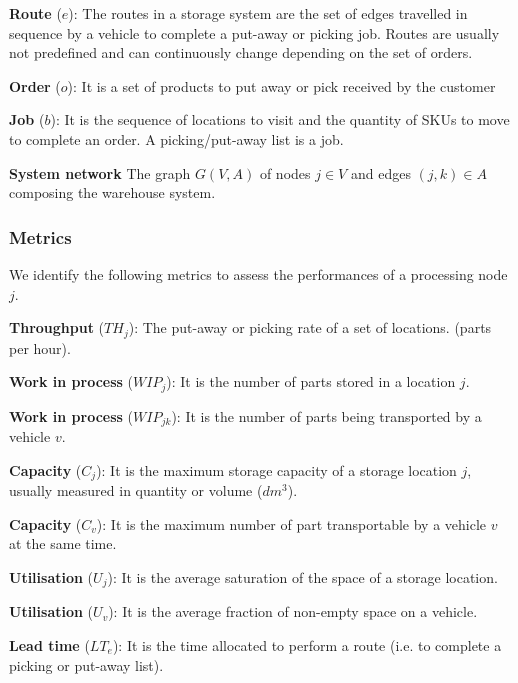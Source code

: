 \textbf{Route} ($e$): The routes in a storage system are the set of edges travelled in sequence by a vehicle to complete a put-away or picking job. Routes are usually not predefined and can continuously change depending on the set of orders. \par

\textbf{Order} ($o$): It is a set of products to put away or pick received by the customer \par

\textbf{Job} ($b$): It is the sequence of locations to visit and the quantity of SKUs to move to complete an order. A picking/put-away list is a job. \par

\textbf{System network} The graph $G(V,A)$ of nodes $j\in V$ and edges $\left(j,k\right)\in A$ composing the warehouse system.

\subsubsection{Metrics}
We identify the following metrics to assess the performances of a processing node $j$.\par

\textbf{Throughput} ($TH_{j}$): The put-away or picking rate of a set of locations. (parts per hour).\par

\textbf{Work in process} ($WIP_{j}$): It is the number of parts stored in a location $j$.\par

\textbf{Work in process} ($WIP_{jk}$): It is the number of parts being transported by a vehicle $v$. \par

\textbf{Capacity} ($C_j$): It is the maximum storage capacity of a storage location $j$, usually measured in quantity or volume ($dm^3$).\par

\textbf{Capacity} ($C_v$): It is the maximum number of part transportable by a vehicle $v$ at the same time. \par

\textbf{Utilisation} ($U_j$): It is the average saturation of the space of a storage location. \par

\textbf{Utilisation} ($U_v$): It is the average fraction of non-empty space on a vehicle. \par

\textbf{Lead time} ($LT_e$): It is the time allocated to perform a route (i.e. to complete a picking or put-away list). \par

